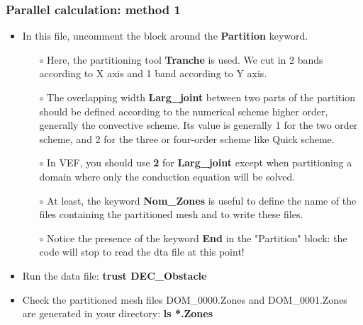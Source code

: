 \documentclass[10pt]{beamer}
\begin{document}
\begin{frame}
\frametitle{Parallel calculation: method 1}
\begin{block}{}

\begin{itemize}
\item In this file, uncomment the block around the \textbf{Partition} keyword.
    \begin{itemize}
    \item [$\circ$] Here, the partitioning tool \textbf{Tranche} is used. We cut in 2 bands according to X axis and 1 band according to Y axis. 
    \item [$\circ$] The overlapping width \textbf{Larg\_joint} between two parts of the partition should be defined according to the numerical scheme higher order, generally the convective scheme. Its value is generally 1 for the two order scheme, and 2 for the three or four-order scheme like Quick scheme.
    \item [$\circ$] In VEF, you should use \textbf{2} for \textbf{Larg\_joint} except when partitioning a domain where only the conduction equation will be solved.
    \item [$\circ$] At least, the keyword \textbf{Nom\_Zones} is useful to define the name of the files containing the partitioned mesh and to write these files.
    \item [$\circ$] Notice the presence of the keyword \textbf{End} in the "Partition" block: the code will stop to read the dta file at this point!
    \end{itemize}

\item Run the data file: \textbf{trust DEC\_Obstacle}

\item Check the partitioned mesh files DOM\_0000.Zones and DOM\_0001.Zones are generated in your directory: \textbf{ls *.Zones}
\end{itemize}

\end{block}
\end{frame}
\end{document}
